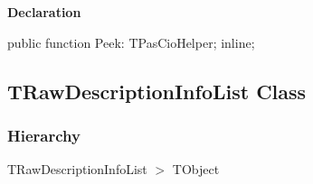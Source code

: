 \documentclass{report}
\newif\ifpdf
\begin{document}
\label{PasDoc_Parser.TPasCioHelperStack-Peek}
\begin{list}{}{
\setlength{\itemindent}{0cm}
\setlength{\listparindent}{0cm}
\setlength{\leftmargin}{\evensidemargin}
\addtolength{\leftmargin}{\tmplength}
\settowidth{\labelsep}{X}
\addtolength{\leftmargin}{\labelsep}
\setlength{\labelwidth}{\tmplength}
}
\item[\textbf{Declaration}\hfill]
\ifpdf
\begin{flushleft}
\fi
\begin{ttfamily}
public function Peek: TPasCioHelper; inline;\end{ttfamily}

\ifpdf
\end{flushleft}
\fi

\end{list}
\ifpdf
\subsection*{\large{\textbf{TRawDescriptionInfoList Class}}\normalsize\hspace{1ex}\hrulefill}
\else
\subsection*{TRawDescriptionInfoList Class}
\fi
\label{PasDoc_Parser.TRawDescriptionInfoList}
\subsubsection*{\large{\textbf{Hierarchy}}\normalsize\hspace{1ex}\hfill}
TRawDescriptionInfoList {$>$} TObject
\end{document}
